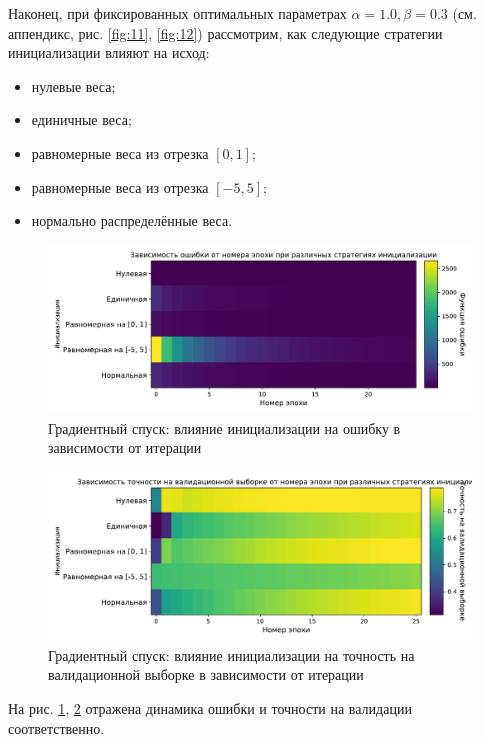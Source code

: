 \documentclass{article}
\begin{document}
                Наконец, при фиксированных оптимальных параметрах $\alpha = 1.0, \beta=0.3$ (см. аппендикс, рис. \ref{fig:11}, \ref{fig:12}) рассмотрим, как следующие стратегии инициализации влияют на исход:
                \begin{itemize}
                    \item нулевые веса;
                    \item единичные веса;
                    \item равномерные веса из отрезка $[0, 1]$;
                    \item равномерные веса из отрезка $[-5, 5]$;
                    \item нормально распределённые веса.
                \end{itemize}
                \begin{figure}[H]
                    \centering
                    \includegraphics[width=0.8\linewidth]{./pictures/GDw0_func.pdf}
                    \caption{Градиентный спуск: влияние инициализации на ошибку в зависимости от итерации}
                    \label{fig:5}
                \end{figure}
                \begin{figure}[H]
                    \centering
                    \includegraphics[width=0.8\linewidth]{./pictures/GDw0_val_accuracy.pdf}
                    \caption{Градиентный спуск: влияние инициализации на точность на валидационной выборке в зависимости от итерации}
                    \label{fig:6}
                \end{figure}
                На рис. \ref{fig:5}, \ref{fig:6} отражена динамика ошибки и точности на валидации соответственно.
\end{document}
